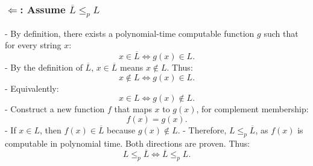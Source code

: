 \documentclass[12pt]{article}
\begin{document}
\subsubsection*{\( \Leftarrow \): Assume \( \overline{L} \leq_p L \)}
- By definition, there exists a polynomial-time computable function \( g \) such that for every string \( x \):
  \[
  x \in \overline{L} \iff g(x) \in L.
  \]
- By the definition of \( \overline{L} \), \( x \in \overline{L} \) means \( x \notin L \). Thus:
  \[
  x \notin L \iff g(x) \in L.
  \]
- Equivalently:
  \[
  x \in L \iff g(x) \notin L.
  \]
- Construct a new function \( f \) that maps \( x \) to \( g(x) \), for complement membership:
  \[
  f(x) = g(x).
  \]
  - If \( x \in L \), then \( f(x) \in \overline{L} \) because \( g(x) \notin L \).
  - Therefore, \( L \leq_p \overline{L} \), as \( f(x) \) is computable in polynomial time.
Both directions are proven. Thus:
\[
L \leq_p \overline{L} \iff \overline{L} \leq_p L.
\]
\end{document}
